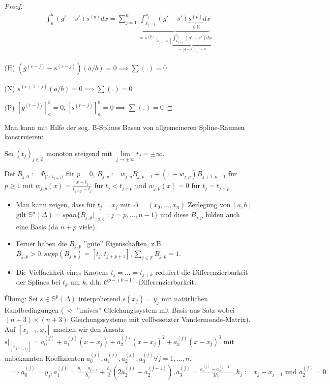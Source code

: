 \begin{proof}
	\begin{align*}
		\int_{a}^{b} (g' - s') \overline{s^{(p)}} dx = \sum_{j=1}^{n} \underbrace{\int_{x_{j-1}}^{x_j} (g' - s') \underbrace{\overline{s^{(p)}}}_{\in \mathbb{K}} dx}_{= \overline{s^{(p)}}_{[x_{j-1}, x_j]} \underbrace{\int_{x_{j-1}}^{x_j} (g' - s') dx}_{=[g-s]_{x_{j-1}}^{x_j} = 0} }
	\end{align*}
	
	(H) $(g^{(r-j)} - s^{(r-j)})(a/b) = 0 \implies \sum(.) = 0$
	
	(N) $\overline{s^{(r+1+j)}}(a/b)=0 \implies \sum (.) = 0$
	
	(P) $[g^{(r-j)}]_a^b = 0, [s^{(r-j)}]_a^b = 0 \implies \sum(.) = 0$
\end{proof}

\begin{remark}
	Man kann mit Hilfe der sog. B-Splines Basen von allgemeineren Spline-Räumen konstruieren:
	
	Sei $(t_j)_{j \in \mathbb{Z}}$ monoton steigend mit $\lim\limits_{j \rightarrow \pm \infty} t_j = \pm \infty$.
	
	Def $B_{j, 0} := \Phi_{[t_j, t_{j+1})}$ für $p = 0$, $B_{j,p} := w_{j,p} B_{j,p-1} + (1-w_{j,p})B_{j+1,p-1}$ für $p \geq 1$ mit $w_{j,p}(x) = \frac{x-t_j}{t_{j+p} - t_j}$ für $t_j < t_{j+p}$ und $w_{j,p}(x) = 0$ für $t_j = t_{j+p}$
	
	\begin{itemize}
		\item Man kann zeigen, dass für $t_j = x_j$ mit $\Delta=(x_0, ..., x_n)$ Zerlegung von $[a,b]$ gilt $\mathbb{S}^p(\Delta) = span\{B_{j,p}|_{[a,b]}: j=p, ..., n-1\}$ und diese $B_{j,p}$ bilden auch eine Basis (da $n+p$ viele).
		
		\item Ferner haben die $B_{j,p}$ ''gute'' Eigenschaften, z.B. $B_{j,p} > 0, supp(B_{j,p}) = [t_j, t_{j+p+1}], \sum_{j \in \mathbb{Z}} B_{j,p} = 1$.
		
		\item Die Vielfachheit eines Knotens $t_j = ... = t_{j+k}$ reduiert die Differenzierbarkeit der Splines bei $t_k$ um $k$, d.h. $\mathcal{C}^{p-(k+1)}$-Differenzierbarkeit.
	\end{itemize}
\end{remark}

Übung: Sei $s \in \mathbb{S}^p(\Delta)$ interpolierend $s(x_j) = y_j$ mit natürlichen Randbedingungen ($\rightsquigarrow$ ''naives'' Gleichungssystem mit Basis aus Satz wobei $(n+3)\times(n+3)$ Gleichungssysteme mit vollbesetzter Vandermonde-Matrix). Auf $[x_{j-1}, x_j]$ machen wir den Ansatz $s|_{[x_{j-1, x_j}]} = a_0^{(j)} + a_1^{(j)} (x-x_j) + a_2^{(j)} (x-x_j)^2 + a_3^{(j)}(x-x_j)^3$ mit unbekannten Koeffizienten $a_0^{(j)}, a_1^{(j)}, a_2^{(j)}, a_3^{(j)} \forall j=1, ..., n$.
\begin{align*}
	\implies a_0^{(j)} = y_j, a_1^{(j)} = \frac{y_j - y_{j-1}}{h_j} + \frac{h_j}{3} (2 a_2^{(j)} + a_2^{(j-1)}), a_3^{(j)} = \frac{a_2^{(j)} - a_2^{(j-1)}}{3h_j}, h_j := x_j - x_{j-1} \text{ und } a_2^{(j)} = 0 
\end{align*}

